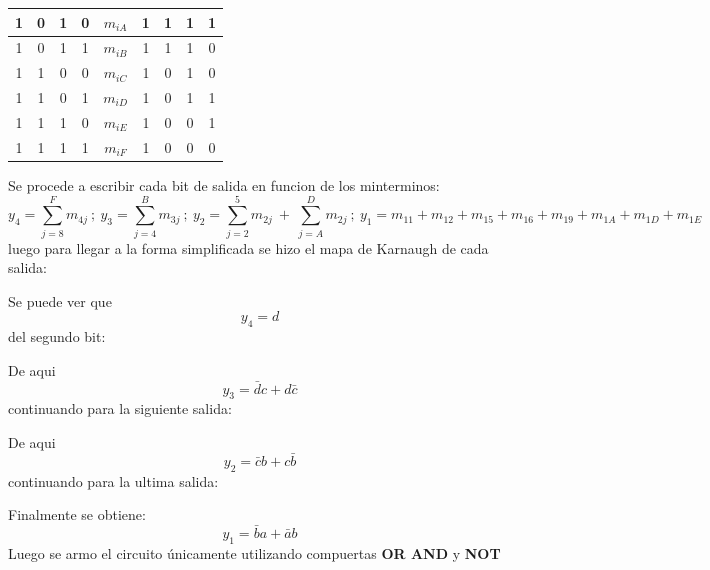 \documentclass[a4paper]{article}
\begin{document}
\begin{table}[H]
\begin{tabular}{|c|c|c|c|c|c|c|c|c|}
1              & 0              & 1              & 0              & \textbf{$m_{iA}$}   & 1              & 1              & 1              & 1              \\ \hline
1              & 0              & 1              & 1              & \textbf{$m_{iB}$}   & 1              & 1              & 1              & 0              \\ \hline
1              & 1              & 0              & 0              & \textbf{$m_{iC}$}   & 1              & 0              & 1              & 0              \\ \hline
1              & 1              & 0              & 1              & \textbf{$m_{iD}$}   & 1              & 0              & 1              & 1              \\ \hline
1              & 1              & 1              & 0              & \textbf{$m_{iE}$}   & 1              & 0              & 0              & 1              \\ \hline
1              & 1              & 1              & 1              & \textbf{$m_{iF}$}   & 1              & 0              & 0              & 0              \\ \hline
\end{tabular}
\end{table}

Se procede a escribir cada bit de salida en funcion de los minterminos:
\[
	y_4 = \sum_{j=8}^{F} m_{4j}  \  ; \ y_3 = \sum_{j=4}^{B} m_{3j}\  ; \ y_2 = \sum_{j=2}^{5} m_{2j} \ + \  \sum_{j=A}^{D} m_{2j}  \  ; \  y_1=m_{11}+m_{12}+m_{15}+m_{16}+m_{19}+m_{1A}+m_{1D}+m_{1E} 
\]
luego para llegar a la forma simplificada se hizo el mapa de Karnaugh de cada salida:

Se puede ver que $$y_4 = d$$
del segundo bit:

De aqui $$y_3 = \bar{d}c+d\bar{c}$$
continuando para la siguiente salida:

De aqui $$y_2 = \bar{c}b+c\bar{b}$$
continuando para la ultima salida:

Finalmente se obtiene: $$y_1 = \bar{b}a+\bar{a}b$$
Luego se armo el circuito únicamente utilizando compuertas \textbf{OR AND } y \textbf{NOT}
\end{document}

